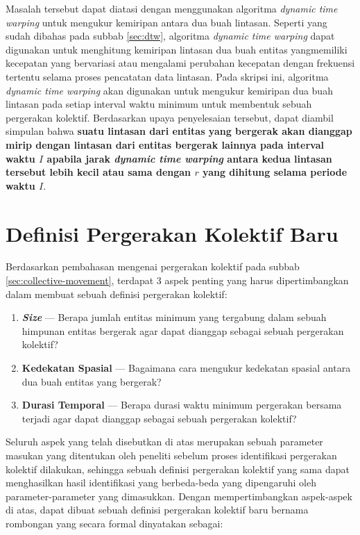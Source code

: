 Masalah tersebut dapat diatasi dengan menggunakan algoritma \textit{dynamic time warping} untuk mengukur kemiripan antara dua buah lintasan. Seperti yang sudah dibahas pada subbab \ref{sec:dtw}, algoritma \textit{dynamic time warping} dapat digunakan untuk menghitung kemiripan lintasan dua buah entitas yangmemiliki kecepatan yang bervariasi atau mengalami perubahan kecepatan dengan frekuensi tertentu selama proses pencatatan data lintasan. Pada skripsi ini, algoritma \textit{dynamic time warping} akan digunakan untuk mengukur kemiripan dua buah lintasan pada setiap interval waktu minimum untuk membentuk sebuah pergerakan kolektif. Berdasarkan upaya penyelesaian tersebut, dapat diambil simpulan bahwa \textbf{suatu lintasan dari entitas yang bergerak akan dianggap mirip dengan lintasan dari entitas bergerak lainnya pada interval waktu $I$ apabila jarak \textit{dynamic time warping} antara kedua lintasan tersebut lebih kecil atau sama dengan $r$ yang dihitung selama periode waktu $I$}. 

\section{Definisi Pergerakan Kolektif Baru}

Berdasarkan pembahasan mengenai pergerakan kolektif pada subbab \ref{sec:collective-movement}, terdapat 3 aspek penting yang harus dipertimbangkan dalam membuat sebuah definisi pergerakan kolektif:

\begin{enumerate}
    \item \textbf{\textit{Size}} --- Berapa jumlah entitas minimum yang tergabung dalam sebuah himpunan entitas bergerak agar dapat dianggap sebagai sebuah pergerakan kolektif?
    \item \textbf{Kedekatan Spasial} --- Bagaimana cara mengukur kedekatan spasial antara dua buah entitas yang bergerak?
    \item \textbf{Durasi Temporal} --- Berapa durasi waktu minimum pergerakan bersama terjadi agar dapat dianggap sebagai sebuah pergerakan kolektif?
\end{enumerate}

Seluruh aspek yang telah disebutkan di atas merupakan sebuah parameter masukan yang ditentukan oleh peneliti sebelum proses identifikasi pergerakan kolektif dilakukan, sehingga sebuah definisi pergerakan kolektif yang sama dapat menghasilkan hasil identifikasi yang berbeda-beda yang dipengaruhi oleh parameter-parameter yang dimasukkan. 
Dengan mempertimbangkan aspek-aspek di atas, dapat dibuat sebuah definisi pergerakan kolektif baru bernama rombongan yang secara formal dinyatakan sebagai:

